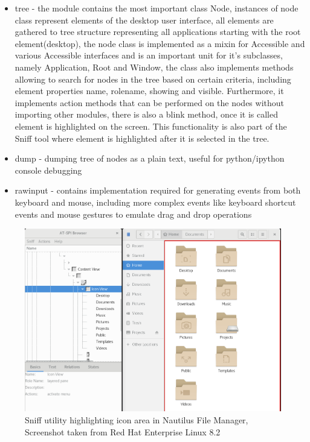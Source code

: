 \begin{itemize}
    \item tree - the module contains the most important class Node, instances of node class represent elements of the desktop user interface, all elements are gathered to tree structure representing all applications starting with the root element(desktop), the node class is implemented as a mixin for Accessible and various Accessible interfaces and is an important unit for it's subclasses, namely Application, Root and Window, the class also implements methods allowing to search for nodes in the tree based on certain criteria, including element properties name, rolename, showing and visible. Furthermore, it implements action methods that can be performed on the nodes without importing other modules, there is also a blink method, once it is called element is highlighted on the screen. This functionality is also part of the Sniff tool where element is highlighted after it is selected in the tree.    
    \item dump - dumping tree of nodes as a plain text, useful for python/ipython console debugging
    \item rawinput - contains implementation required for generating events from both keyboard and mouse, including more complex events like keyboard shortcut events and mouse gestures to emulate drag and drop operations  
\end{itemize}

 \begin{figure}[hbt]
	\centering
	\includegraphics[width=1\textwidth]{obrazky-figures/sniff.png}
	\caption{Sniff utility highlighting icon area in Nautilus File Manager, Screenshot taken from Red Hat Enterprise Linux 8.2}
	\label{sniff}
\end{figure}

